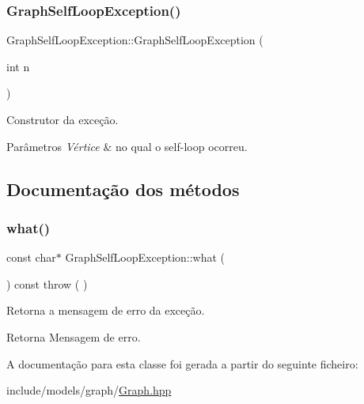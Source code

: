 \subsubsection{\texorpdfstring{GraphSelfLoopException()}{GraphSelfLoopException()}}
{\footnotesize\ttfamily Graph\+Self\+Loop\+Exception\+::\+Graph\+Self\+Loop\+Exception (\begin{DoxyParamCaption}\item[{int}]{n }\end{DoxyParamCaption})\hspace{0.3cm}{\ttfamily [inline]}}

Construtor da exceção. 
\begin{DoxyParams}{Parâmetros}
{\em Vértice} & no qual o self-\/loop ocorreu. \\
\hline
\end{DoxyParams}


\subsection{Documentação dos métodos}
\mbox{\label{classGraphSelfLoopException_ae608d642082d2183111b8a43a1bfa64f}} 
\subsubsection{\texorpdfstring{what()}{what()}}
{\footnotesize\ttfamily const char$\ast$ Graph\+Self\+Loop\+Exception\+::what (\begin{DoxyParamCaption}{ }\end{DoxyParamCaption}) const throw ( ) \hspace{0.3cm}{\ttfamily [inline]}}

Retorna a mensagem de erro da exceção. \begin{DoxyReturn}{Retorna}
Mensagem de erro. 
\end{DoxyReturn}


A documentação para esta classe foi gerada a partir do seguinte ficheiro\+:\begin{DoxyCompactItemize}
\item 
include/models/graph/\mbox{\hyperlink{Graph_8hpp}{Graph.\+hpp}}\end{DoxyCompactItemize}
